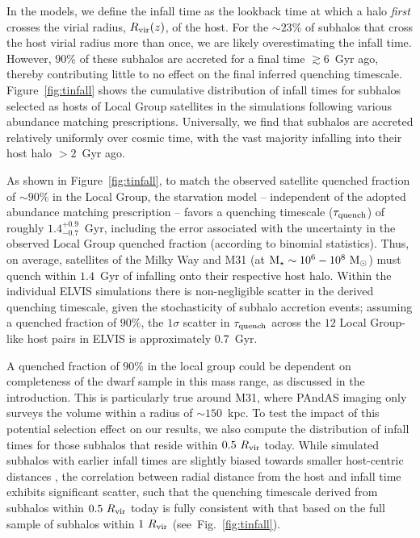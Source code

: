 \documentclass[usenatbib]{mn2e}
\newcommand{\mstar}{{\rm M}_{\star}}
\newcommand{\msun}{{\rm M}_{\odot}}
\begin{document}
In the models, we define the infall time as the lookback time at which
a halo \emph{first} crosses the virial radius, $R_{\rm vir}(z)$, of
the host. For the $\sim 23\%$ of subhalos that cross the host virial
radius more than once, we are likely overestimating the infall
time. However, $90\%$ of these subhalos are accreted for a final time
$\gtrsim6$~Gyr ago, thereby contributing little to no effect on the
final inferred quenching timescale. Figure~\ref{fig:tinfall} shows the
cumulative distribution of infall times for subhalos selected as hosts
of Local Group satellites in the simulations following various
abundance matching prescriptions. Universally, we find that subhalos
are accreted relatively uniformly over cosmic time, with the vast
majority infalling into their host halo $>2$~Gyr ago.





As shown in Figure~\ref{fig:tinfall}, to match the observed satellite
quenched fraction of $\sim90\%$ in the Local Group, the starvation
model -- independent of the adopted abundance matching prescription --
favors a quenching timescale ($\tau_{\rm quench}$) of roughly
$1.4^{+0.9}_{-0.7}$~Gyr, including the error associated with the
uncertainty in the observed Local Group quenched fraction (according
to binomial statistics). Thus, on average, satellites of the Milky Way
and M31 (at $\mstar \sim 10^{6}-10^{8}~\msun$) must quench within
$1.4$~Gyr of infalling onto their respective host halo. Within the
individual ELVIS simulations there is non-negligible scatter in the
derived quenching timescale, given the stochasticity of subhalo
accretion events; assuming a quenched fraction of $90\%$, the
$1\sigma$ scatter in $\tau_{\rm quench}$ across the $12$ Local
Group-like host pairs in ELVIS is approximately $0.7$~Gyr.
  


A quenched fraction of $90\%$ in the local group could be dependent on
completeness of the dwarf sample in this mass range, as discussed in
the introduction. This is particularly true around M31, where PAndAS
imaging only surveys the volume within a radius of $\sim150$~kpc. To
test the impact of this potential selection effect on our results, we
also compute the distribution of infall times for those subhalos that
reside within $0.5~R_{\rm vir}$ today. While simulated subhalos with
earlier infall times are slightly biased towards smaller host-centric
distances \citep[e.g.][]{diemand08, rocha12, wetzel15}, the
correlation between radial distance from the host and infall time
exhibits significant scatter, such that the quenching timescale
derived from subhalos within $0.5~R_{\rm vir}$ today is fully
consistent with that based on the full sample of subhalos within
$1~R_{\rm vir}$ (see~Fig.~\ref{fig:tinfall}).
\end{document}
